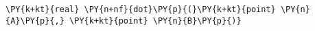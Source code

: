 \begin{Verbatim}[commandchars=\\\{\}]
    \PY{k+kt}{real} \PY{n+nf}{dot}\PY{p}{(}\PY{k+kt}{point} \PY{n}{A}\PY{p}{,} \PY{k+kt}{point} \PY{n}{B}\PY{p}{)}
\end{Verbatim}
